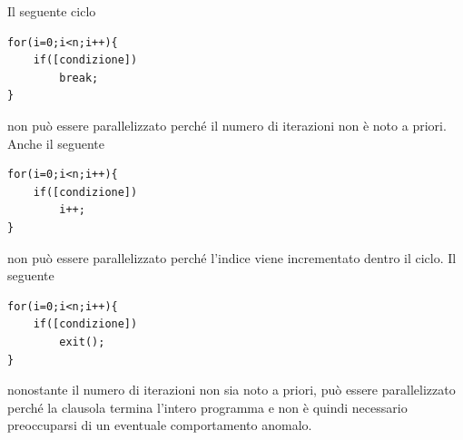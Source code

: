\documentclass[10pt, letterpaper]{report}
\begin{document}
Il seguente ciclo 
\begin{lstlisting}[style=CStyle]
for(i=0;i<n;i++){
    if([condizione])
        break;
}
\end{lstlisting}
non può essere parallelizzato perché il numero di iterazioni non è noto a priori. Anche il seguente
\begin{lstlisting}[style=CStyle]
for(i=0;i<n;i++){
    if([condizione])
        i++;
}
\end{lstlisting}
non può essere parallelizzato perché l'indice viene incrementato dentro il ciclo. Il seguente 
\begin{lstlisting}[style=CStyle]
for(i=0;i<n;i++){
    if([condizione])
        exit();
}
\end{lstlisting}
nonostante il numero di iterazioni non sia noto a priori, può essere parallelizzato perché la clausola  termina l'intero programma e non è quindi necessario preoccuparsi di un eventuale comportamento anomalo.
\end{document}
